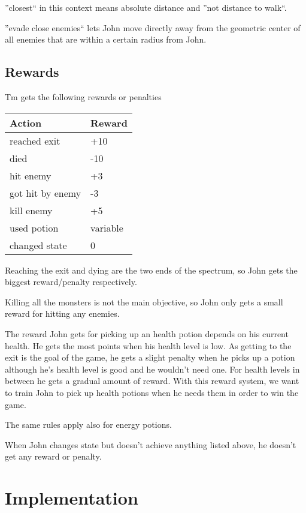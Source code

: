 \documentclass[a4paper,10pt]{scrartcl}
\begin{document}
''closest`` in this context means absolute distance and ''not distance to walk``.

''evade close enemies`` lets John move directly away from the geometric center of all enemies that are within a certain radius from John.

\subsection{Rewards}
Tm gets the following rewards or penalties
\begin{center}
\begin{tabular}{l|l}
Action & Reward \\
\hline
reached exit & +10 \\
died & -10 \\
hit enemy & +3 \\
got hit by enemy & -3 \\
kill enemy & +5 \\
used potion & variable\\
changed state & 0
\end{tabular}
\end{center}

Reaching the exit and dying are the two ends of the spectrum, so John gets the biggest reward/penalty respectively.

Killing all the monsters is not the main objective, so John only gets a small reward for hitting any enemies.

The reward John gets for picking up an health potion depends on his current health. He gets the most points when his health level is low. As getting to the exit is the goal of the game, he gets a slight penalty when he picks up a potion although he's health level is good and he wouldn't need one. 
For health levels in between he gets a gradual amount of reward. 
With this reward system, we want to train John to pick up health potions when he needs them in order to win the game.
 
The same rules apply also for energy potions. 

When John changes state but doesn't achieve anything listed above, he doesn't get any reward or penalty. 


\section{Implementation}\label{sec:implementation}
\end{document}
